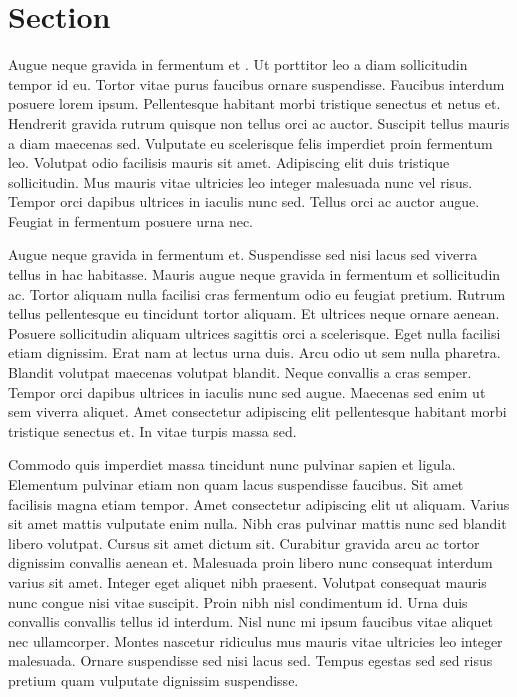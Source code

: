 \section{Section}
\label{sec:section}

Augue neque gravida in fermentum et \cite{Fuchs2007}. Ut porttitor leo a diam sollicitudin tempor id eu. Tortor vitae purus faucibus ornare suspendisse. Faucibus interdum posuere lorem ipsum. Pellentesque habitant morbi tristique senectus et netus et. Hendrerit gravida rutrum quisque non tellus orci ac auctor. Suscipit tellus mauris a diam maecenas sed. Vulputate eu scelerisque felis imperdiet proin fermentum leo. Volutpat odio facilisis mauris sit amet. Adipiscing elit duis tristique sollicitudin. Mus mauris vitae ultricies leo integer malesuada nunc vel risus. Tempor orci dapibus ultrices in iaculis nunc sed. Tellus orci ac auctor augue. Feugiat in fermentum posuere urna nec.

Augue neque gravida in fermentum et. Suspendisse sed nisi lacus sed viverra tellus in hac habitasse. Mauris augue neque gravida in fermentum et sollicitudin ac. Tortor aliquam nulla facilisi cras fermentum odio eu feugiat pretium. Rutrum tellus pellentesque eu tincidunt tortor aliquam. Et ultrices neque ornare aenean. Posuere sollicitudin aliquam ultrices sagittis orci a scelerisque. Eget nulla facilisi etiam dignissim. Erat nam at lectus urna duis. Arcu odio ut sem nulla pharetra. Blandit volutpat maecenas volutpat blandit. Neque convallis a cras semper. Tempor orci dapibus ultrices in iaculis nunc sed augue. Maecenas sed enim ut sem viverra aliquet. Amet consectetur adipiscing elit pellentesque habitant morbi tristique senectus et. In vitae turpis massa sed.

Commodo quis imperdiet massa tincidunt nunc pulvinar sapien et ligula. Elementum pulvinar etiam non quam lacus suspendisse faucibus. Sit amet facilisis magna etiam tempor. Amet consectetur adipiscing elit ut aliquam. Varius sit amet mattis vulputate enim nulla. Nibh cras pulvinar mattis nunc sed blandit libero volutpat. Cursus sit amet dictum sit. Curabitur gravida arcu ac tortor dignissim convallis aenean et. Malesuada proin libero nunc consequat interdum varius sit amet. Integer eget aliquet nibh praesent. Volutpat consequat mauris nunc congue nisi vitae suscipit. Proin nibh nisl condimentum id. Urna duis convallis convallis tellus id interdum. Nisl nunc mi ipsum faucibus vitae aliquet nec ullamcorper. Montes nascetur ridiculus mus mauris vitae ultricies leo integer malesuada. Ornare suspendisse sed nisi lacus sed. Tempus egestas sed sed risus pretium quam vulputate dignissim suspendisse.

